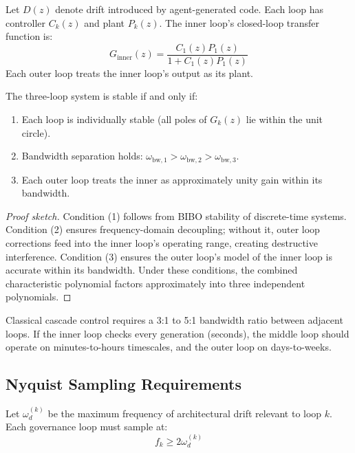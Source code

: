 Let $D(z)$ denote drift introduced by agent-generated code. Each loop has controller $C_k(z)$ and plant $P_k(z)$. The inner loop's closed-loop transfer function is:
\begin{equation}
    G_{\mathrm{inner}}(z) = \frac{C_1(z) P_1(z)}{1 + C_1(z) P_1(z)}
\end{equation}
Each outer loop treats the inner loop's output as its plant.

\begin{theorem}
\label{thm:cascade-stability}
The three-loop system is stable if and only if:
\begin{enumerate}
    \item Each loop is individually stable (all poles of $G_k(z)$ lie within the unit circle).
    \item Bandwidth separation holds: $\omega_{\mathrm{bw},1} > \omega_{\mathrm{bw},2} > \omega_{\mathrm{bw},3}$.
    \item Each outer loop treats the inner as approximately unity gain within its bandwidth.
\end{enumerate}
\end{theorem}

\begin{proof}[Proof sketch]
Condition (1) follows from BIBO stability of discrete-time systems. Condition (2) ensures frequency-domain decoupling; without it, outer loop corrections feed into the inner loop's operating range, creating destructive interference. Condition (3) ensures the outer loop's model of the inner loop is accurate within its bandwidth. Under these conditions, the combined characteristic polynomial factors approximately into three independent polynomials.
\end{proof}

Classical cascade control requires a 3:1 to 5:1 bandwidth ratio between adjacent loops. If the inner loop checks every generation (seconds), the middle loop should operate on minutes-to-hours timescales, and the outer loop on days-to-weeks.

\subsection{Nyquist Sampling Requirements}

Let $\omega_d^{(k)}$ be the maximum frequency of architectural drift relevant to loop $k$. Each governance loop must sample at:
\begin{equation}
    f_k \geq 2\omega_d^{(k)}
\end{equation}

